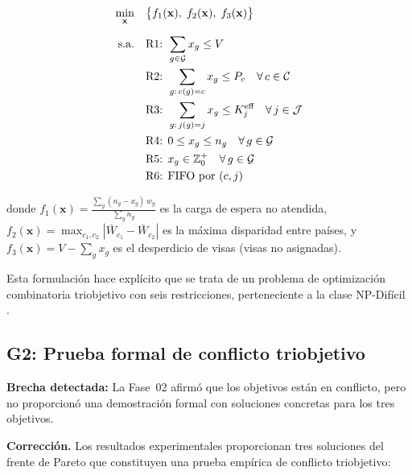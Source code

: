\documentclass[12pt,letterpaper]{article}
\begin{document}
\begin{formulabox}
\begin{align}
\min_{\mathbf{x}} \quad & \bigl\{ f_1(\mathbf{x}),\; f_2(\mathbf{x}),\; f_3(\mathbf{x}) \bigr\} \label{eq:compact}\\[6pt]
\text{s.a.} \quad
& \text{R1: } \sum_{g \in \mathcal{G}} x_g \leq V \notag\\
& \text{R2: } \sum_{g:\,c(g)=c} x_g \leq P_c \quad \forall\, c \in \mathcal{C} \notag\\
& \text{R3: } \sum_{g:\,j(g)=j} x_g \leq K_j^{\text{eff}} \quad \forall\, j \in \mathcal{J} \notag\\
& \text{R4: } 0 \leq x_g \leq n_g \quad \forall\, g \in \mathcal{G} \notag\\
& \text{R5: } x_g \in \mathbb{Z}^{+}_0 \quad \forall\, g \in \mathcal{G} \notag\\
& \text{R6: FIFO por } (c, j) \notag
\end{align}

donde $f_1(\mathbf{x}) = \frac{\sum_{g}(n_g - x_g)\,w_g}{\sum_{g} n_g}$ es la carga de espera no atendida, $f_2(\mathbf{x}) = \max_{c_1,c_2}|\bar{W}_{c_1} - \bar{W}_{c_2}|$ es la máxima disparidad entre países, y $f_3(\mathbf{x}) = V - \sum_{g} x_g$ es el desperdicio de visas (visas no asignadas).
\end{formulabox}

Esta formulación hace explícito que se trata de un problema de optimización combinatoria triobjetivo con seis restricciones, perteneciente a la clase NP-Difícil \parencite{gareyjohnson1979}.

\subsection{G2: Prueba formal de conflicto triobjetivo}

\begin{notebox}
\textbf{Brecha detectada:} La Fase~02 afirmó que los objetivos están en conflicto, pero no proporcionó una demostración formal con soluciones concretas para los tres objetivos.
\end{notebox}

\textbf{Corrección.} Los resultados experimentales proporcionan tres soluciones del frente de Pareto que constituyen una prueba empírica de conflicto triobjetivo:
\end{document}
